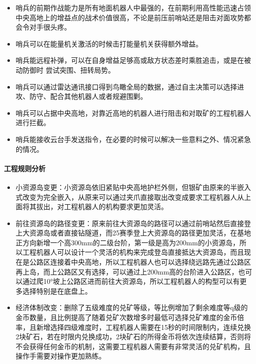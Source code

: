                 \begin{itemize}
                    \item 哨兵的前期作战能力是所有地面机器人中最强的，在前期利用高性能迅速占领中央高地上的增益点的战术价值很高，不论是前压前哨站还是阻击对面攻势都会令对手很头疼。
                    \item 哨兵可以在能量机关激活的时候击打能量机关获得额外增益。
                    \item 哨兵能远程补弹，可以在自身增益足够高或敌方状态差时乘胜追击，或是在被动防御时 尝试突围、扭转局势。
                    \item 哨兵可以通过雷达通讯接口得到鸟瞰全局的数据，通过自主决策可以选择进攻、防守、配合其他机器人或者规避围剿。
                    \item 哨兵可以占据中央高地，对靠近高地的机器人进行阻击和对取矿的工程机器人进行拦截。
                    \item 哨兵能接收云台手发送指令，在必要的时候可以解决一些意料之外、情况紧急的情况。
                \end{itemize}

        \paragraph{工程规则分析}

    
            \begin{itemize}
                \item 小资源岛变更：小资源岛依旧紧贴中央高地护栏外侧，但银矿由原来的半嵌入式改变为完全嵌入，从原来可以通过夹爪直接取出改变成要求工程机器人从上面将其拔出，对工程机器人的机构要求更加灵活。
                \item 前往资源岛的路径变更：原来前往大资源岛的路径可以通过前哨站然后直接登上大资源岛或者直接钻隧道，而25赛季登上大资源岛的路径更加灵活，在基地正方向新增一个高300mm的二级台阶，第一级是高为200mm的小资源岛，所以工程机器人可以设计一个灵活的机构来完成登岛直接抵达大资源岛，而且现在是公路区连接着中央高地，所以工程机器人也可以选择绕远路先通过公路区再上岛，而上公路区又有选择，可以通过上200mm高的台阶进入公路区，也可以通过爬10°坡上公路区进而前往大资源岛，所以工程机器人的构型可以有更多选择特别是在底盘上。
                \item 经济体制改变：删除了五级难度的兑矿等级，等比例增加了剩余难度等q级的金币数量，且比例提高了随着兑矿次数增多时最低可选择兑矿难度的金币倍率，且新增选择四级难度时，工程机器人需要在15秒的时间限制内，连续兑换2块矿石，若在时限内兑换成功，2块矿石的所得金币将依次连续结算，否则将不会获得任何金币的机制，这需要工程机器人需要有非常灵活的兑矿机构，且操作手需要对操作更加熟练。 
            \end{itemize}

